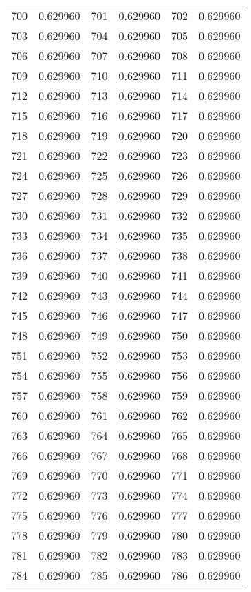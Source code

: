 \documentclass[12pt]{article}
\begin{document}
\begin{longtable}{@{}cc|cc|cc@{}}
700 & 0.629960 & 701 & 0.629960 & 702 & 0.629960 \\
703 & 0.629960 & 704 & 0.629960 & 705 & 0.629960 \\
706 & 0.629960 & 707 & 0.629960 & 708 & 0.629960 \\
709 & 0.629960 & 710 & 0.629960 & 711 & 0.629960 \\
712 & 0.629960 & 713 & 0.629960 & 714 & 0.629960 \\
715 & 0.629960 & 716 & 0.629960 & 717 & 0.629960 \\
718 & 0.629960 & 719 & 0.629960 & 720 & 0.629960 \\
721 & 0.629960 & 722 & 0.629960 & 723 & 0.629960 \\
724 & 0.629960 & 725 & 0.629960 & 726 & 0.629960 \\
727 & 0.629960 & 728 & 0.629960 & 729 & 0.629960 \\
730 & 0.629960 & 731 & 0.629960 & 732 & 0.629960 \\
733 & 0.629960 & 734 & 0.629960 & 735 & 0.629960 \\
736 & 0.629960 & 737 & 0.629960 & 738 & 0.629960 \\
739 & 0.629960 & 740 & 0.629960 & 741 & 0.629960 \\
742 & 0.629960 & 743 & 0.629960 & 744 & 0.629960 \\
745 & 0.629960 & 746 & 0.629960 & 747 & 0.629960 \\
748 & 0.629960 & 749 & 0.629960 & 750 & 0.629960 \\
751 & 0.629960 & 752 & 0.629960 & 753 & 0.629960 \\
754 & 0.629960 & 755 & 0.629960 & 756 & 0.629960 \\
757 & 0.629960 & 758 & 0.629960 & 759 & 0.629960 \\
760 & 0.629960 & 761 & 0.629960 & 762 & 0.629960 \\
763 & 0.629960 & 764 & 0.629960 & 765 & 0.629960 \\
766 & 0.629960 & 767 & 0.629960 & 768 & 0.629960 \\
769 & 0.629960 & 770 & 0.629960 & 771 & 0.629960 \\
772 & 0.629960 & 773 & 0.629960 & 774 & 0.629960 \\
775 & 0.629960 & 776 & 0.629960 & 777 & 0.629960 \\
778 & 0.629960 & 779 & 0.629960 & 780 & 0.629960 \\
781 & 0.629960 & 782 & 0.629960 & 783 & 0.629960 \\
784 & 0.629960 & 785 & 0.629960 & 786 & 0.629960 \\

\end{longtable}
\end{document}
